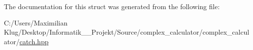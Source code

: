 The documentation for this struct was generated from the following file\+:\begin{DoxyCompactItemize}
\item 
C\+:/\+Users/\+Maximilian Klug/\+Desktop/\+Informatik\+\_\+\_\+\+Projekt/\+Source/complex\+\_\+calculator/complex\+\_\+calculator/\mbox{\hyperlink{catch_8hpp}{catch.\+hpp}}\end{DoxyCompactItemize}
